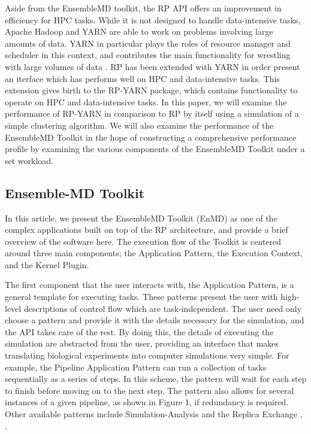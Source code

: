 \documentclass[]{article}
\begin{document}
		Aside from the EnsembleMD toolkit, the RP API offers an improvement in efficiency for HPC tasks. While it is not designed to handle data-intensive tasks, Apache Hadoop and YARN are able to work on problems involving large amounts of data. YARN in particular plays the roles of resource manager and scheduler in this context, and contributes the main functionality for wrestling with large volumes of data \cite{apache_hadoop_yarn}. RP has been extended with YARN in order present an iterface which has performs well on HPC and data-intensive tasks. This extension gives birth to the RP-YARN package, which contains functionality to operate on HPC and data-intensive tasks. In this paper, we will examine the performance of RP-YARN in comparison to RP by itself using a simulation of a simple clustering algorithm. We will also examine the performance of the EnsembleMD Toolkit in the hope of constructing a comprehensive performance profile by examining the various components of the EnsembleMD Toolkit under a set workload.

	\subsection{Ensemble-MD Toolkit} 
		In this article, we present the EnsembleMD Toolkit (EnMD) as one of the complex applications built on top of the RP architecture, and provide a brief overview of the software here. The execution flow of the Toolkit is centered around three main components; the Application Pattern, the Execution Context, and the Kernel Plugin. 


		The first component that the user interacts with, the Application Pattern, is a general template for executing tasks. These patterns present the user with high-level descriptions of control flow which are task-independent. The user need only choose a pattern and provide it with the details necessary for the simulation, and the API takes care of the rest. By doing this, the details of executing the simulation are abstracted from the user, providing an interface that makes translating biological experiments into computer simulations very simple. For example, the Pipeline Application Pattern can run a collection of tasks sequentially as a series of steps. In this scheme, the pattern will wait for each step to finish before moving on to the next step. The pattern also allows for several instances of a given pipeline, as shown in Figure 1, if redundancy is required. Other available patterns include Simulation-Analysis and the Replica Exchange \cite{enmd_paper}, \cite{repex_paper}.
\end{document}
